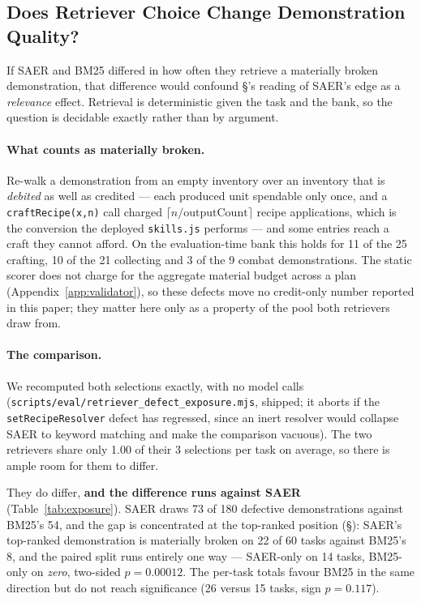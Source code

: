 \documentclass[letterpaper]{article} %
\newcommand{\appref}[1]{Appendix~\ref{#1}}
\newcommand{\bodyref}[1]{\getrefnumber{#1}}
\begin{document}
\subsection*{Does Retriever Choice Change Demonstration Quality?}
\label{app:exposure}

If SAER and BM25 differed in how often they retrieve a materially broken
demonstration, that difference would confound \S\bodyref{sec:ablation}'s
reading of SAER's edge as a \emph{relevance} effect.  Retrieval is
deterministic given the task and the bank, so the question is decidable
exactly rather than by argument.

\paragraph{What counts as materially broken.}  Re-walk a demonstration
from an empty inventory over an inventory that is \emph{debited} as well
as credited --- each produced unit spendable only once, and a
\texttt{craftRecipe(x,n)} call charged
$\lceil n/\text{outputCount}\rceil$ recipe applications, which is the
conversion the deployed \texttt{skills.js} performs --- and some entries
reach a craft they cannot afford.  On the evaluation-time bank this
holds for 11 of the 25 crafting, 10 of the 21 collecting and 3 of the 9
combat demonstrations.  The static scorer does not charge for the
aggregate material budget across a plan (\appref{app:validator}), so these defects move no credit-only number reported in this paper; they
matter here only as a property of the pool both retrievers draw from.

\paragraph{The comparison.}  We recomputed both selections exactly, with
no model calls
(\texttt{scripts/\allowbreak eval/\allowbreak retriever\_\allowbreak defect\_\allowbreak exposure.mjs}, shipped; it
aborts if the \texttt{setRecipeResolver} defect has regressed, since an
inert resolver would collapse SAER to keyword matching and make the
comparison vacuous).  The two retrievers share only 1.00 of their 3
selections per task on average, so there is ample room for them to
differ.

They do differ, \textbf{and the difference runs against SAER}
(Table~\ref{tab:exposure}).  SAER draws 73 of 180 defective
demonstrations against BM25's 54, and the gap is concentrated at the
top-ranked position (\S\bodyref{sec:context}):
SAER's top-ranked demonstration is materially broken on 22 of 60 tasks
against BM25's 8, and the paired split runs entirely one way --- SAER-only
on 14 tasks, BM25-only on \emph{zero}, two-sided $p{=}0.00012$.  The per-task
totals favour BM25 in the same direction but do not reach significance
(26 versus 15 tasks, sign $p{=}0.117$).
\end{document}

